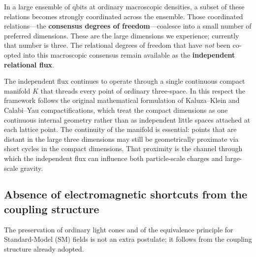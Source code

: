 \documentclass[11pt,a4paper]{article}
\begin{document}
In a large ensemble of qbits at ordinary macroscopic densities, a subset of these relations becomes strongly coordinated across the ensemble. Those coordinated relations---the \textbf{consensus degrees of freedom}---coalesce into a small number of preferred dimensions. These are the large dimensions we experience; currently that number is three. The relational degrees of freedom that have \emph{not} been co-opted into this macroscopic consensus remain available as the \textbf{independent relational flux}.

The independent flux continues to operate through a single continuous compact manifold \(K\) that threads every point of ordinary three-space. In this respect the framework follows the original mathematical formulation of Kaluza--Klein and Calabi--Yau compactifications, which treat the compact dimensions as one continuous internal geometry rather than as independent little spaces attached at each lattice point. The continuity of the manifold is essential: points that are distant in the large three dimensions may still be geometrically proximate via short cycles in the compact dimensions. That proximity is the channel through which the independent flux can influence both particle-scale charges and large-scale gravity.

\subsection{Absence of electromagnetic shortcuts from the coupling structure}
\label{sec:no-shortcuts}

The preservation of ordinary light cones and of the equivalence principle for Standard-Model (SM) fields is not an extra postulate; it follows from the coupling structure already adopted.
\end{document}
